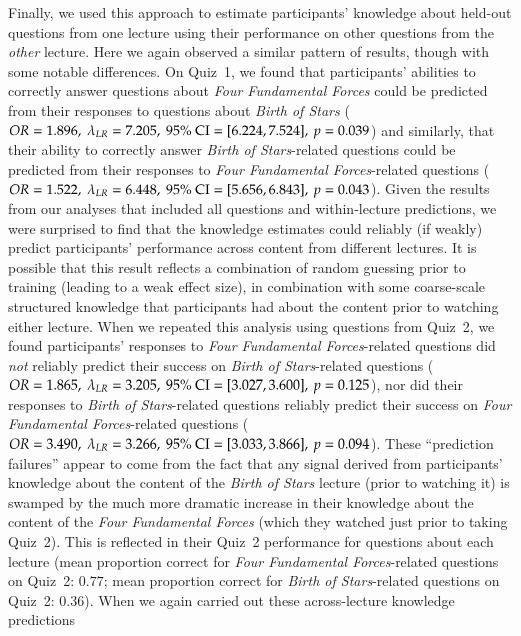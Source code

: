 \documentclass[10pt]{article}
\begin{document}
Finally, we used this approach to estimate participants' knowledge about
held-out questions from one lecture using their performance on other questions
from the \textit{other} lecture. Here we again observed a similar pattern of
results, though with some notable differences. On Quiz~1, we found that
participants' abilities to correctly answer questions about \textit{Four
Fundamental Forces} could be predicted from their responses to questions about
\textit{Birth of Stars} ($OR = 1.896,\ \lambda_{LR} = 7.205,\ 95\%\
\textnormal{CI} = [6.224, 7.524],\ p = 0.039$) and similarly, that their
ability to correctly answer \textit{Birth of Stars}-related questions could be
predicted from their responses to \textit{Four Fundamental Forces}-related
questions ($OR = 1.522,\ \lambda_{LR} = 6.448,\ 95\%\ \textnormal{CI} = [5.656,
6.843],\ p = 0.043$). Given the results from our analyses that included all
questions and within-lecture predictions, we were surprised to find that the
knowledge estimates could reliably (if weakly) predict participants'
performance across content from different lectures. It is possible that this
result reflects a combination of random guessing prior to training (leading to
a weak effect size), in combination with some coarse-scale structured knowledge
that participants had about the content prior to watching either lecture. When
we repeated this analysis using questions from Quiz~2, we found participants'
responses to \textit{Four Fundamental Forces}-related questions did
\textit{not} reliably predict their success on \textit{Birth of Stars}-related
questions ($OR = 1.865,\ \lambda_{LR} = 3.205,\ 95\%\ \textnormal{CI} = [3.027,
3.600],\ p = 0.125$), nor did their responses to \textit{Birth of
Stars}-related questions reliably predict their success on \textit{Four
Fundamental Forces}-related questions ($OR = 3.490,\ \lambda_{LR} = 3.266,\
95\%\ \textnormal{CI} = [3.033, 3.866],\ p = 0.094$). These ``prediction
failures'' appear to come from the fact that any signal derived from
participants' knowledge about the content of the \textit{Birth of Stars}
lecture (prior to watching it) is swamped by the much more dramatic increase in
their knowledge about the content of the \textit{Four Fundamental Forces}
(which they watched just prior to taking Quiz~2). This is reflected in their
Quiz~2 performance for questions about each lecture (mean proportion correct
for \textit{Four Fundamental Forces}-related questions on Quiz~2: $0.77$; mean
proportion correct for \textit{Birth of Stars}-related questions on Quiz~2:
$0.36$). When we again carried out these across-lecture knowledge predictions
\end{document}
